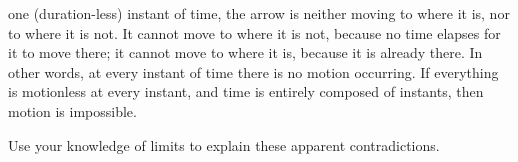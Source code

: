 \begin{questions}
\begin{itemize}
                    one (duration-less) instant of time, the arrow is neither moving to where it is, nor to where it is not. It cannot move to
                    where it is not, because no time elapses for it to move there; it cannot move to where it is, because it is already there.
                    In other words, at every instant of time there is no motion occurring. If everything is motionless at every instant, and
                    time is entirely composed of instants, then motion is impossible.
            \end{itemize}
            Use your knowledge of limits to explain these apparent contradictions.
\end{questions}

